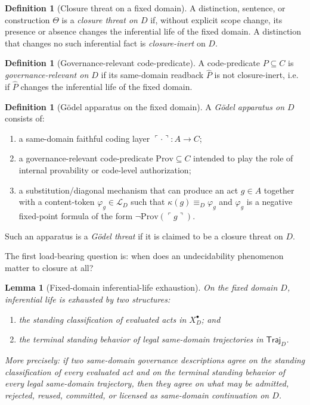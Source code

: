 \documentclass[11pt]{article}
\theoremstyle{plain}
\newtheorem{lemma}[theorem]{Lemma}
\theoremstyle{definition}
\newtheorem{definition}[theorem]{Definition}
\newcommand{\Prov}{\mathrm{Prov}}
\newcommand{\code}[1]{\ulcorner #1 \urcorner}
\newcommand{\Eval}{X_D^{\bullet}}
\newcommand{\domain}{D}
\newcommand{\Traj}{\mathsf{Traj}_D}
\begin{document}
\begin{definition}[Closure threat on a fixed domain]
A distinction, sentence, or construction $\Theta$ is a \emph{closure threat on $\domain$} if, without explicit scope change, its presence or absence changes the inferential life of the fixed domain. A distinction that changes no such inferential fact is \emph{closure-inert} on $\domain$.
\end{definition}

\begin{definition}[Governance-relevant code-predicate]
A code-predicate $P\subseteq C$ is \emph{governance-relevant on $\domain$} if its same-domain readback $\widehat P$ is not closure-inert, i.e. if $\widehat P$ changes the inferential life of the fixed domain.
\end{definition}

\begin{definition}[G\"odel apparatus on the fixed domain]
A \emph{G\"odel apparatus on $\domain$} consists of:
\begin{enumerate}[label=(\alph*), leftmargin=2.5em]
    \item a same-domain faithful coding layer $\code{\cdot}:A\to C$;
    \item a governance-relevant code-predicate $\Prov\subseteq C$ intended to play the role of internal provability or code-level authorization;
    \item a substitution/diagonal mechanism that can produce an act $g\in A$ together with a content-token $\varphi_g\in \mathcal{L}_{\domain}$ such that $\kappa(g)\equiv_{\domain}\varphi_g$ and $\varphi_g$ is a negative fixed-point formula of the form $\neg \Prov(\code{g})$.
\end{enumerate}
Such an apparatus is a \emph{G\"odel threat} if it is claimed to be a closure threat on $\domain$.
\end{definition}

The first load-bearing question is: when does an undecidability phenomenon matter to closure at all?

\begin{lemma}[Fixed-domain inferential-life exhaustion]
\label{lem:inferential-life-exhaustion}
On the fixed domain $\domain$, inferential life is exhausted by two structures:
\begin{enumerate}[label=(\roman*), leftmargin=2.5em]
    \item the standing classification of evaluated acts in $\Eval$; and
    \item the terminal standing behavior of legal same-domain trajectories in $\Traj$.
\end{enumerate}
More precisely: if two same-domain governance descriptions agree on the standing classification of every evaluated act and on the terminal standing behavior of every legal same-domain trajectory, then they agree on what may be admitted, rejected, reused, committed, or licensed as same-domain continuation on $\domain$.
\end{lemma}
\end{document}
